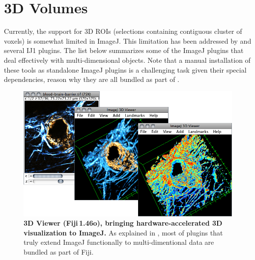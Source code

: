 \section{3D Volumes\label{sub:3D-Intro}}

Currently, the support for 3D
ROIs (selections containing contiguous cluster of voxels) is somewhat
limited in ImageJ. This limitation has been addressed by 
and several IJ1 plugins. The list below summarizes some of the ImageJ
plugins that deal effectively with multi-dimensional objects. Note
that a manual installation of these tools as standalone ImageJ plugins
is a challenging task given their special dependencies, reason why
they are all bundled as part of .
\begin{figure}
\noindent \includegraphics[width=0.7\columnwidth]{images/3Dviewer}\caption[3D Viewer]{\label{fig:-3D-Viewer}\textbf{3D Viewer (Fiji\,1.46o), bringing
hardware-accelerated 3D visualization to ImageJ.} As explained in
, most of plugins that truly extend ImageJ
functionally to multi-dimentional data are bundled as part of Fiji.}
\end{figure}

